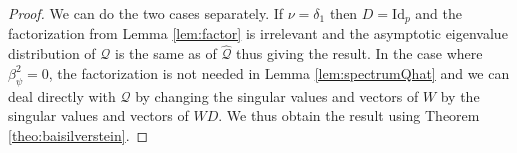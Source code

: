 \documentclass[letterpaper, 10pt, dvipsnames]{article}
\numberwithin{equation}{section}
\DeclareMathOperator{\Id}{Id}
\newcommand{\Rbb}{\mathbb{R}}
\newcommand{\Q}{\mathcal{Q}}
\newcommand{\R}{\mathcal{R}}
\renewcommand{\hat}{\widehat}
\newtheorem{lem}[ccounter]{Lemma}
\theoremstyle{definition}
\begin{document}
\begin{proof}
  We can do the two cases separately. If $\nu=\delta_1$ then $D=\mathrm{Id}_p$ and the factorization from Lemma \ref{lem:factor} is irrelevant and the asymptotic eigenvalue distribution of $\Q$ is the same as of $\hat{\Q}$ thus giving the result. In the case where $\beta_\psi^2=0$, the factorization is not needed in Lemma \ref{lem:spectrumQhat} and we can deal directly with $\Q$ by changing the singular values and vectors of $W$ by the singular values and vectors of $WD$. We thus obtain the result using Theorem \ref{theo:baisilverstein}.
\end{proof}

\end{document}
